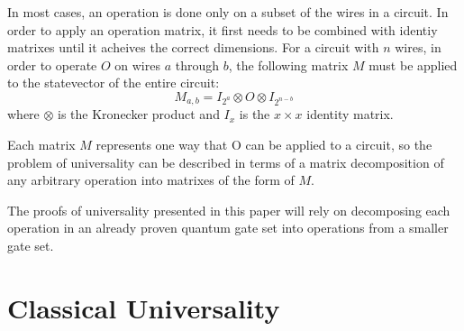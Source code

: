 \documentclass[12pt]{article}
\begin{document}
In most cases, an operation is done only on a subset of the wires in a circuit. In order to apply an operation matrix, it first needs to be combined with identiy matrixes until it acheives the correct dimensions. For a circuit with $n$ wires, in order to operate $O$ on wires $a$ through $b$, the following matrix $M$ must be applied to the statevector of the entire circuit:
$$M_{a, b} = I_{2^a} \otimes O \otimes I_{2^{n - b}}$$
where $\otimes$ is the Kronecker product and $I_x$ is the $x \times x$ identity matrix.

Each matrix $M$ represents one way that O can be applied to a circuit, so the problem of universality can be described in terms of a matrix decomposition of any arbitrary operation into matrixes of the form of $M$.

The proofs of universality presented in this paper will rely on decomposing each operation in an already proven quantum gate set into operations from a smaller gate set.

\section{Classical Universality}
\end{document}
